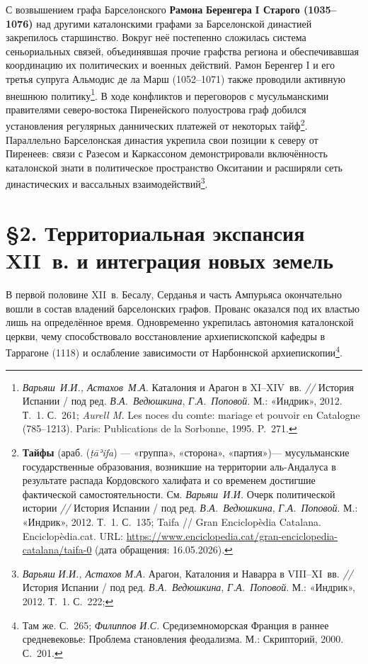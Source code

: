 С возвышением графа Барселонского \textbf{Рамона }\textbf{Беренгера}\textbf{ I Старого (1035--1076)} над другими каталонскими графами за Барселонской династией закрепилось старшинство. Вокруг неё постепенно сложилась система сеньориальных связей, объединявшая прочие графства региона и обеспечивавшая координацию их политических и военных действий. Рамон Беренгер I и его третья супруга Альмодис де ла Марш (1052--1071) также проводили активную внешнюю политику\footnote{\emph{Варьяш}\emph{~И.И., Астахов~М.А.} Каталония и Арагон в XI--XIV~вв. \emph{// }История Испании / под ред. \emph{В.А.~Ведюшкина}, \emph{Г.А.~Поповой}. М.: «Индрик», 2012. Т.~1. С.~261; \emph{Aurell M.} Les noces du comte: mariage et pouvoir en Catalogne (785--1213). Paris: Publications de la Sorbonne, 1995. P.~271.}. В ходе конфликтов и переговоров с мусульманскими правителями северо-востока Пиренейского полуострова граф добился установления регулярных даннических платежей от некоторых тайф\footnote{\textbf{Тайфы} (араб. \textbf{} (\emph{{\unicodefallback ṭ}ā{\unicodefallback ʾ}ifa}) --- «группа», «сторона», «партия»)--- мусульманские государственные образования, возникшие на территории аль-Андалуса в результате распада Кордовского халифата и со временем достигшие фактической самостоятельности. См. \emph{Варьяш}\emph{~И.И.} Очерк политической истории \emph{// }История Испании / под ред. \emph{В.А.~Ведюшкина}, \emph{Г.А.~Поповой}. М.: «Индрик», 2012. Т.~1. С.~135; Taifa // Gran Enciclopèdia Catalana. Enciclopèdia.cat. URL: \url{https://www.enciclopedia.cat/gran-enciclopedia-catalana/taifa-0} (дата обращения: 16.05.2026).}. Параллельно Барселонская династия укрепила свои позиции к северу от Пиренеев: связи с Разесом и Каркассоном демонстрировали включённость каталонской знати в политическое пространство Окситании и расширяли сеть династических и вассальных взаимодействий\footnote{\emph{Варьяш}\emph{ И.И., Астахов М.А.} Арагон, Каталония и Наварра в VIII--XI~вв. \emph{// }История Испании / под ред. \emph{В.А.~Ведюшкина}, \emph{Г.А.~Поповой}. М.: «Индрик», 2012. Т.~1. С.~222;}.

\section*{§2. Территориальная экспансия XII~в. и интеграция новых земель}

В первой половине XII~в. Бесалу, Серданья и часть Ампурьяса окончательно вошли в состав владений барселонских графов. Прованс оказался под их властью лишь на определённое время. Одновременно укрепилась автономия каталонской церкви, чему способствовало восстановление архиепископской кафедры в Таррагоне (1118) и ослабление зависимости от Нарбоннской архиепископии\footnote{Там же. С.~265; \emph{Филиппов И.С.} Средиземноморская Франция в раннее средневековье: Проблема становления феодализма. М.: Скрипторий, 2000. С.~201.}.

